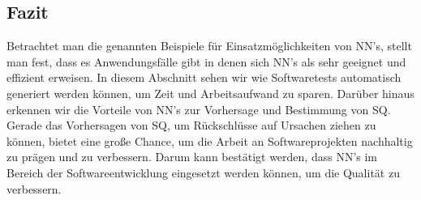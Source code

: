 \subsection{Fazit}
Betrachtet man die genannten Beispiele für Einsatzmöglichkeiten von NN's, stellt man fest, dass es Anwendungsfälle gibt in denen sich NN's als sehr geeignet und effizient erweisen. In diesem Abschnitt sehen wir wie Softwaretests automatisch generiert werden können, um Zeit und Arbeitsaufwand zu sparen. Darüber hinaus erkennen wir die Vorteile von NN's zur Vorhersage und Bestimmung von SQ. Gerade das Vorhersagen von SQ, um Rückschlüsse auf Ursachen ziehen zu können, bietet eine große Chance, um die Arbeit an Softwareprojekten nachhaltig zu prägen und zu verbessern. Darum kann bestätigt werden, dass NN's im Bereich der Softwareentwicklung eingesetzt werden können, um die Qualität zu verbessern.
